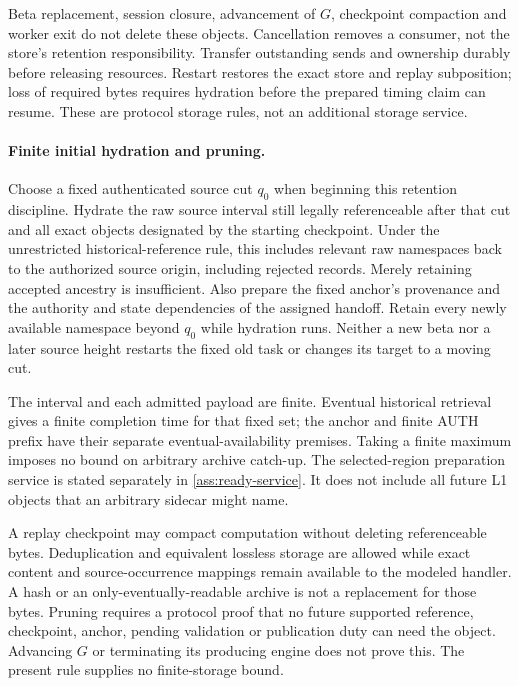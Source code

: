 Beta replacement, session closure, advancement of $G$, checkpoint
compaction and worker exit do not delete these objects. Cancellation
removes a consumer, not the store's retention responsibility. Transfer
outstanding sends and ownership durably before releasing resources.
Restart restores the exact store and replay subposition; loss of required
bytes requires hydration before the prepared timing claim can resume.
These are protocol storage rules, not an additional storage service.

\paragraph{Finite initial hydration and pruning.}
\label{sec:source-hydration}
Choose a fixed authenticated source cut $q_0$ when beginning this
retention discipline. Hydrate the raw source interval still legally
referenceable after that cut and all exact objects designated by the
starting checkpoint. Under the unrestricted historical-reference rule,
this includes relevant raw namespaces back to the authorized source
origin, including rejected records. Merely retaining accepted ancestry
is insufficient. Also prepare the fixed anchor's provenance and the
authority and state dependencies of the assigned handoff.
Retain every newly available namespace beyond $q_0$ while hydration
runs. Neither a new beta nor a later source height restarts the fixed
old task or changes its target to a moving cut.

The interval and each admitted payload are finite. Eventual historical
retrieval gives a finite completion time for that fixed set; the anchor
and finite AUTH prefix have their separate eventual-availability
premises. Taking a finite maximum imposes no bound on arbitrary archive catch-up.
The selected-region preparation service is stated separately in
\cref{ass:ready-service}. It does not include all future
L1 objects that an arbitrary sidecar might name.

A replay checkpoint may compact computation without deleting
referenceable bytes. Deduplication and equivalent lossless storage are
allowed while exact content and source-occurrence mappings remain
available to the modeled handler. A hash or an only-eventually-readable
archive is not a replacement for those bytes. Pruning requires a
protocol proof that no future supported reference, checkpoint,
anchor, pending validation or publication duty can need the object.
Advancing $G$ or terminating its producing engine does not prove this.
The present rule supplies no finite-storage bound.

